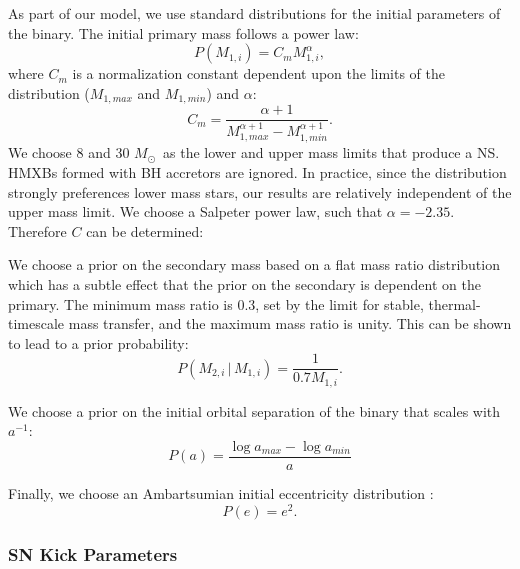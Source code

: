 \documentclass[12pt, preprint]{aastex}
\newcommand{\given}{\,|\,}
\newcommand{\Msun}{\ifmmode {M_{\odot}}\else${M_{\odot}}$\fi}
\begin{document}
As part of our model, we use standard distributions for the initial parameters of the binary. The initial primary mass follows a power law:
\begin{equation}
P(M_{1,i}) = C_m M_{1,i}^{\alpha},
\end{equation}
where $C_m$ is a normalization constant dependent upon the limits of the distribution ($M_{1,max}$ and $M_{1,min}$) and $\alpha$:
\begin{equation}
C_m = \frac{\alpha + 1}{M_{1,max}^{\alpha+1} - M_{1,min}^{\alpha+1}}.
\end{equation}
We choose 8 and 30 \Msun\ as the lower and upper mass limits that produce a NS. HMXBs formed with BH accretors are ignored. In practice, since the distribution strongly preferences lower mass stars, our results are relatively independent of the upper mass limit. We choose a Salpeter power law, such that $\alpha = -2.35$. Therefore $C$ can be determined:

We choose a prior on the secondary mass based on a flat mass ratio distribution which has a subtle effect that the prior on the secondary is dependent on the primary. The minimum mass ratio is 0.3, set by the limit for stable, thermal-timescale mass transfer, and the maximum mass ratio is unity. This can be shown to lead to a prior probability:
\begin{equation}
P(M_{2,i} \given M_{1,i}) = \frac{1}{0.7 M_{1,i}}.
\end{equation}

We choose a prior on the initial orbital separation of the binary that scales with $a^{-1}$:
\begin{equation}
P(a) = \frac{\log a_{max} - \log a_{min}}{a}
\end{equation}

Finally, we choose an Ambartsumian initial eccentricity distribution \citep{ambartsumian37, duquennoy91}:
\begin{equation}
P(e) = e^2.
\end{equation}


\subsubsection{SN Kick Parameters}
\end{document}
